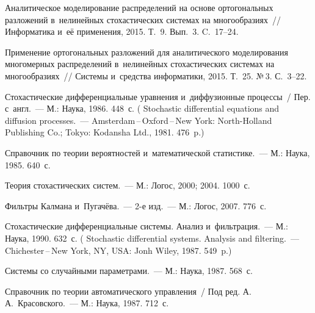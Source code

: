 \begin{multicols}{2}
{{\begin{thebibliography}{99}
Аналитическое моделирование распределений на основе ортогональных разложений 
в~нелинейных стохастических системах на многообразиях~// 
Информатика и~её применения, 2015. Т.~9. Вып.~3. C.~17--24.

Применение ортогональных разложений для аналитического моделирования многомерных 
распределений в~нелинейных стохастических системах на многообразиях~// 
Системы и~средства информатики, 2015. Т.~25. №\,3. С.~3--22.

 Стохастические дифференциальные уравнения 
и~диффузионные процессы~/ Пер. с~англ.~--- М.: Наука, 1986. 448~с.
( 
Stochastic differential equations and diffusion processes.~--- 
Amsterdam\,--\,Oxford\,--\,New York: North-Holland Publishing Co.; 
Tokyo: Kodansha Ltd., 1981. 476~p.)

Справочник по теории вероятностей и~математической статистике.~---
М.: Наука, 1985. 640~с.


Теория стохастических систем.~--- М.: Логос, 2000; 2004. 1000~с.


Фильтры Калмана и~Пугачёва.~--- 2-е изд.~--- М.: Логос, 2007.
776~с.


Стохастические дифференциальные системы. Анализ и~фильтрация.~--- М.:
Наука,  1990.  632~с. (
Stochastic differential systems.
Analysis and filtering.~--- Chichester\,--\,New York, NY, USA: Jonh Wiley, 1987.
549~p.)




Системы со случайными параметрами.~--- М.: Наука, 1987. 568~с.

Справочник по теории автоматического управления~/ Под ред. А.\,А.~Красовского.~--- 
М.: Наука, 1987. 712~с.

\end{thebibliography}

 }
 }

\end{multicols}

